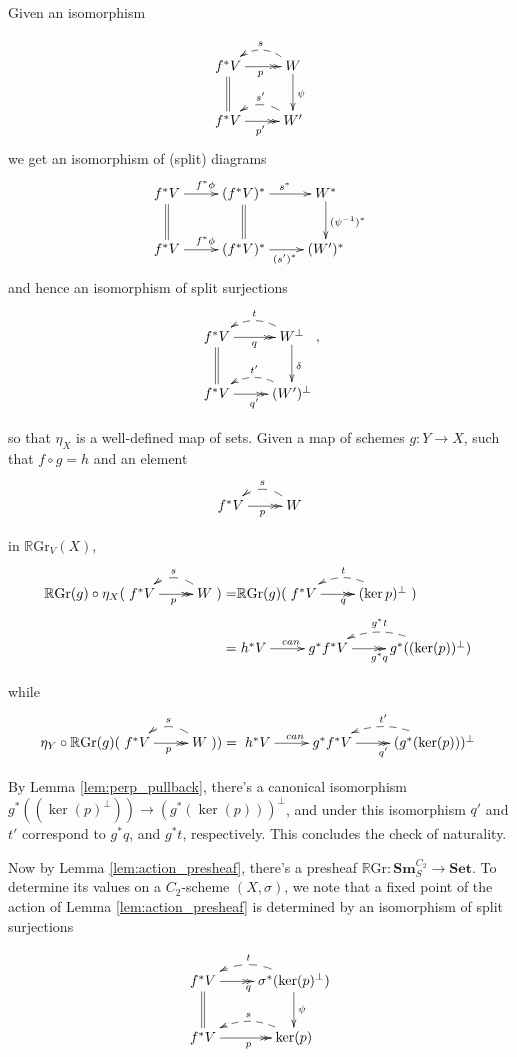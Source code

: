 \documentclass[edeposit,fullpage]{uiucthesis2009}
\newcommand{\RGr}{\mathbb R\mathrm{Gr}}
\newcommand{\Set}{\mathbf{Set}}
\newcommand{\Sm}[1]{\mathbf{Sm}_{#1}}
\theoremstyle{plain}
\numberwithin{lemma}{section}
\theoremstyle{definition}
\begin{document}
Given an isomorphism 

\[
\xymatrix{f^*V \ar@{>>}[r]_p \ar@{=}[d]& \ar@/_1.0pc/@{-->}[l]_sW \ar[d]^\psi\\
f^*V \ar@{>>}[r]_{p'} & \ar@/_1.0pc/@{-->}[l]_{s'}W'}
\]
we get an isomorphism of (split) diagrams
\[
\xymatrix{f^*V \ar[r]^{f^*\phi}\ar@{=}[d] &(f^*V)^*\ar[r]^{s^*} \ar@{=}[d] & W^* \ar[d]^{(\psi^{-1})^*}\\
f^*V \ar[r]^{f^*\phi} & (f^*V)^* \ar[r]_{(s')^* }& (W')^*}
\]
and hence an isomorphism of split surjections
\[
\xymatrix{f^*V \ar@{>>}[r]_q \ar@{=}[d]& \ar@/_1.0pc/@{-->}[l]_tW^\perp \ar[d]^\delta\\
f^*V \ar@{>>}[r]_{q'} & \ar@/_1.0pc/@{-->}[l]_{t'}(W')^\perp},
\]

so that $\eta_X$ is a well-defined map of sets. Given a map of schemes
$g : Y \rightarrow X$, such that $f\circ g = h$ and an element 
\[
\xymatrix{f^*V \ar@{>>}[r]_p & \ar@/_1.0pc/@{-->}[l]_sW}
\]

in $\RGr_V(X)$, 
\begin{align*}
\RGr(g) \circ \eta_X(\xymatrix{f^*V \ar@{>>}[r]_p &
  \ar@/_1.0pc/@{-->}[l]_sW}) = & \RGr(g)( \xymatrix{f^*V \ar@{>>}[r]_q
  & \ar@/_1.0pc/@{-->}[l]_t(\ker p)^\perp})\\
 = & \xymatrix{h^*V \ar[r]^{can} & g^*f^*V \ar@{>>}[r]_{g^*q} &
  \ar@/_1.0pc/@{-->}[l]_{g^*t} g^*((\ker(p))^\perp)}
\end{align*}

while
\begin{align*}
\eta_Y\circ\RGr(g)(\xymatrix{f^*V \ar@{>>}[r]_p &
  \ar@/_1.0pc/@{-->}[l]_sW})) = \xymatrix{h^*V \ar[r]^{can} & g^*f^*V \ar@{>>}[r]_{q'} &
  \ar@/_1.0pc/@{-->}[l]_{t'} (g^*(\ker(p)))^\perp}
\end{align*}

By Lemma \ref{lem:perp_pullback}, there's a canonical isomorphism
$g^*((\ker(p)^\perp)) \rightarrow (g^*(\ker(p)))^\perp$, and under
this isomorphism $q'$ and $t'$ correspond to $g^*q$, and $g^*t$,
respectively. This concludes the check of naturality.


Now by Lemma \ref{lem:action_presheaf}, there's a presheaf $\RGr :
\Sm{S}^{C_2} \rightarrow \Set$. To determine its values on a
$C_2$-scheme $(X,\sigma)$, we note that a fixed point of the action of Lemma
\ref{lem:action_presheaf} is determined by an isomorphism of split
surjections

\[
\xymatrix{f^*V \ar@{>>}[r]_q \ar@{=}[d]& \ar@/_1.0pc/@{-->}[l]_t\sigma^*(\ker(p)^\perp) \ar[d]^\psi\\
f^*V \ar@{>>}[r]_{p} & \ar@/_1.0pc/@{-->}[l]_{s}\ker(p)}
\]
\end{document}
